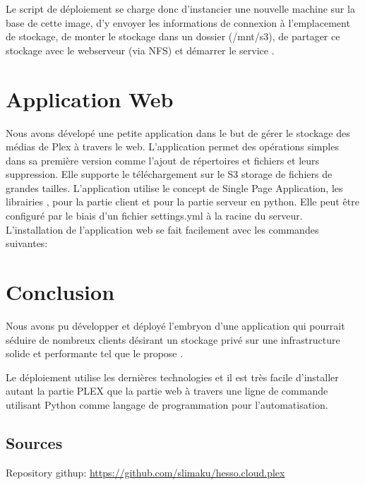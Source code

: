 \documentclass[french]{msereport}
\newcommand{\aws}{\brand{Amazon Web Services}}
\newcommand{\plex}{\brand{PLEX}}
\begin{document}
		Le script de déploiement se charge donc d’instancier une nouvelle machine sur la base de cette image, d’y envoyer les informations de connexion à l’emplacement de stockage, de monter le stockage dans un dossier (/mnt/s3), de partager ce stockage avec le webserveur (via NFS) et démarrer le service \plex.
	
	\section{Application Web}
		Nous avons dévelopé une petite application dans le but de gérer le stockage des médias de Plex à travers le web. L’application permet des opérations simples dans sa première version comme l’ajout de répertoires et fichiers et leurs suppression. Elle supporte le téléchargement sur le S3 storage de fichiers de grandes tailles.
		L’application utilise le concept de Single Page Application, les librairies ,  pour la partie client et  pour la partie serveur en python.
		Elle peut être configuré par le biais d’un fichier settings.yml à la racine du serveur. L’installation de l’application web se fait facilement avec les commandes suivantes:
		
		
	
	\section{Conclusion}
		Nous avons pu développer et déployé l'embryon d’une application qui pourrait séduire de nombreux clients désirant un stockage privé sur une infrastructure solide et performante tel que le propose \aws.
		
		Le déploiement utilise les dernières technologies et il est très facile d’installer autant la partie PLEX que la partie web à travers une ligne de commande utilisant Python comme langage de programmation pour l’automatisation.
			
	
	\appendixsection
		\subsection{Sources}
			Repository githup: \url{https://github.com/slimaku/hesso.cloud.plex}
		
\end{document}
